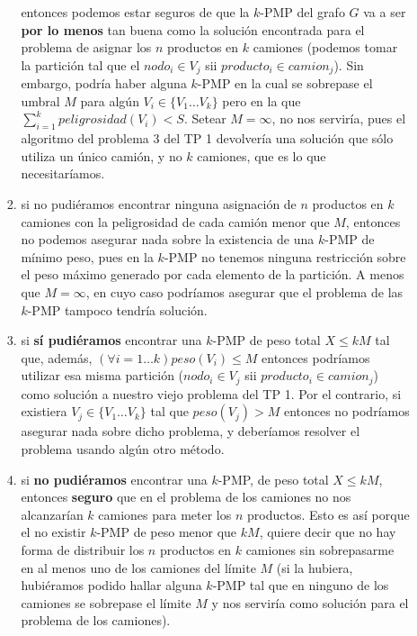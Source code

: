 \documentclass[11pt, a4paper, twoside]{article}
\begin{document}
\begin{enumerate}
\begin{enumerate}
\begin{enumerate}
			      entonces podemos estar seguros de que la $k$-PMP del grafo $G$ va a ser 
			      \textbf{por lo menos} tan buena como la solución encontrada para el problema
			      de asignar los $n$ productos en $k$ camiones (podemos tomar la partición tal
			      que el $nodo_{i} \in V_{j}$ sii $producto_{i} \in camion_{j}$).
			      Sin embargo, podría haber alguna $k$-PMP en la
			      cual se sobrepase el umbral $M$ para algún $V_{i} \in \{V_{1} \dots V_{k}\}$
			      pero en la que $ \sum\limits_{i=1}^k peligrosidad(V_{i}) < S$. Setear
			      $M = \infty$, no nos serviría, pues el algoritmo del problema 3 del TP 1 
			      devolvería una solución que sólo utiliza un único camión, y no $k$ camiones,
			      que es lo que necesitaríamos.
			      
			      \item si no pudiéramos encontrar ninguna asignación de $n$ productos en $k$ 
			      camiones con la peligrosidad de cada camión menor que $M$, entonces no podemos
			      asegurar nada sobre la existencia de una $k$-PMP de mínimo peso, pues en la
			      $k$-PMP no tenemos ninguna restricción sobre el peso máximo generado por cada
			      elemento de la partición. A menos que $M = \infty$, en cuyo caso podríamos
			      asegurar que el problema de las $k$-PMP tampoco tendría solución.
			      
			      \item si \textbf{sí pudiéramos} encontrar una $k$-PMP de peso total $X \leq kM$
			      tal que, además, $(\forall i=1 \dots k) peso(V_{i}) \leq M$ entonces podríamos
			      utilizar esa misma partición ($nodo_{i} \in V_{j}$ sii $producto_{i} \in 
			      camion_{j}$) como solución a nuestro viejo problema del TP 1. Por el contrario,
			      si existiera $V_{j} \in \{V_{1} \dots V_{k}\}$ tal que $peso(V_{j}) > M $ 
			      entonces no podríamos asegurar nada sobre dicho problema, y deberíamos resolver
			      el problema usando algún otro método.
			      
			      \item si \textbf{no pudiéramos} encontrar una $k$-PMP, de peso
			      total $X \leq kM$, entonces \textbf{seguro}  que en el problema de los camiones
			      no nos alcanzarían $k$ camiones para meter los $n$ productos. Esto es así porque
			      el no existir $k$-PMP de peso menor que $kM$, quiere decir que no hay forma de 
			      distribuir los $n$ productos en $k$ camiones sin sobrepasarme en al menos uno
			      de los camiones del límite $M$ (si la hubiera, hubiéramos podido hallar alguna
			      $k$-PMP tal que en ninguno de los camiones se sobrepase el límite $M$ y nos 
			      serviría como solución para el problema de los camiones).
			      

\end{enumerate}
\end{enumerate}
\end{enumerate}
\end{document}
